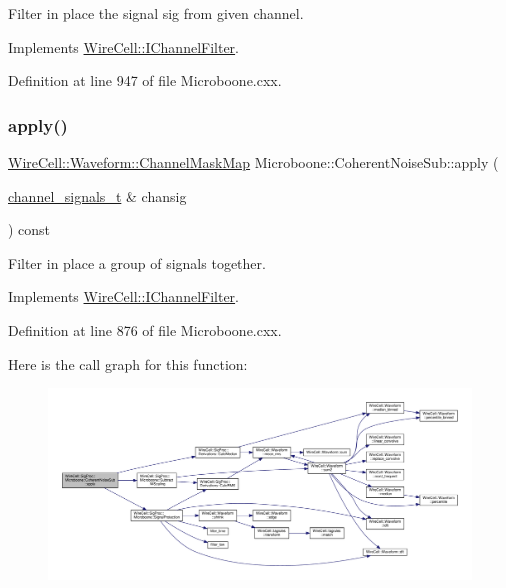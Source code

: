 Filter in place the signal {\ttfamily sig} from given {\ttfamily channel}. 

Implements \hyperlink{class_wire_cell_1_1_i_channel_filter_a6981186ee38a4b9b66e16c0d9b376b08}{Wire\+Cell\+::\+I\+Channel\+Filter}.



Definition at line 947 of file Microboone.\+cxx.

\mbox{\label{class_wire_cell_1_1_sig_proc_1_1_microboone_1_1_coherent_noise_sub_a0c98bcbea0288592dfe6603e92b742b5}} 
\subsubsection{\texorpdfstring{apply()}{apply()}\hspace{0.1cm}{\footnotesize\ttfamily [2/2]}}
{\footnotesize\ttfamily \hyperlink{namespace_wire_cell_1_1_waveform_a18b9ae61c858e340252ba3ac83ac3bc0}{Wire\+Cell\+::\+Waveform\+::\+Channel\+Mask\+Map} Microboone\+::\+Coherent\+Noise\+Sub\+::apply (\begin{DoxyParamCaption}\item[{\hyperlink{class_wire_cell_1_1_i_channel_filter_a44de35ce47701d84cd45393c6bcd5e2f}{channel\+\_\+signals\+\_\+t} \&}]{chansig }\end{DoxyParamCaption}) const\hspace{0.3cm}{\ttfamily [virtual]}}

Filter in place a group of signals together. 

Implements \hyperlink{class_wire_cell_1_1_i_channel_filter_a47554d77b1dca5596dc61e2221e0a137}{Wire\+Cell\+::\+I\+Channel\+Filter}.



Definition at line 876 of file Microboone.\+cxx.

Here is the call graph for this function\+:
\nopagebreak
\begin{figure}[H]
\begin{center}
\leavevmode
\includegraphics[width=350pt]{class_wire_cell_1_1_sig_proc_1_1_microboone_1_1_coherent_noise_sub_a0c98bcbea0288592dfe6603e92b742b5_cgraph}
\end{center}
\end{figure}


